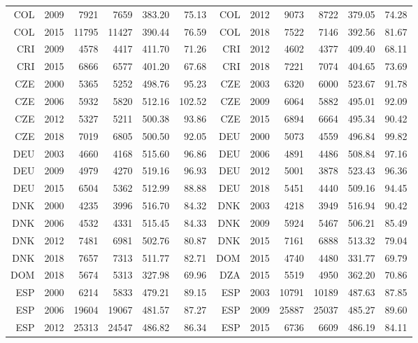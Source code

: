 {\begin{longtable}{r|r|r|r|r|r||r|r|r|r|r|r}
    COL   & 2009  & 7921  & 7659  & 383.20 & 75.13 & COL   & 2012  & 9073  & 8722  & 379.05 & 74.28 \\
    COL   & 2015  & 11795 & 11427 & 390.44 & 76.59 & COL   & 2018  & 7522  & 7146  & 392.56 & 81.67 \\
    CRI   & 2009  & 4578  & 4417  & 411.70 & 71.26 & CRI   & 2012  & 4602  & 4377  & 409.40 & 68.11 \\
    CRI   & 2015  & 6866  & 6577  & 401.20 & 67.68 & CRI   & 2018  & 7221  & 7074  & 404.65 & 73.69 \\
    CZE   & 2000  & 5365  & 5252  & 498.76 & 95.23 & CZE   & 2003  & 6320  & 6000  & 523.67 & 91.78 \\
    CZE   & 2006  & 5932  & 5820  & 512.16 & 102.52 & CZE   & 2009  & 6064  & 5882  & 495.01 & 92.09 \\
    CZE   & 2012  & 5327  & 5211  & 500.38 & 93.86 & CZE   & 2015  & 6894  & 6664  & 495.34 & 90.42 \\
    CZE   & 2018  & 7019  & 6805  & 500.50 & 92.05 & DEU   & 2000  & 5073  & 4559  & 496.84 & 99.82 \\
    DEU   & 2003  & 4660  & 4168  & 515.60 & 96.86 & DEU   & 2006  & 4891  & 4486  & 508.84 & 97.16 \\
    DEU   & 2009  & 4979  & 4270  & 519.16 & 96.93 & DEU   & 2012  & 5001  & 3878  & 523.43 & 96.36 \\
    DEU   & 2015  & 6504  & 5362  & 512.99 & 88.88 & DEU   & 2018  & 5451  & 4440  & 509.16 & 94.45 \\
    DNK   & 2000  & 4235  & 3996  & 516.70 & 84.32 & DNK   & 2003  & 4218  & 3949  & 516.94 & 90.42 \\
    DNK   & 2006  & 4532  & 4331  & 515.45 & 84.33 & DNK   & 2009  & 5924  & 5467  & 506.21 & 85.49 \\
    DNK   & 2012  & 7481  & 6981  & 502.76 & 80.87 & DNK   & 2015  & 7161  & 6888  & 513.32 & 79.04 \\
    DNK   & 2018  & 7657  & 7313  & 511.77 & 82.71 & DOM   & 2015  & 4740  & 4480  & 331.77 & 69.79 \\
    DOM   & 2018  & 5674  & 5313  & 327.98 & 69.96 & DZA   & 2015  & 5519  & 4950  & 362.20 & 70.86 \\
    ESP   & 2000  & 6214  & 5833  & 479.21 & 89.15 & ESP   & 2003  & 10791 & 10189 & 487.63 & 87.85 \\
    ESP   & 2006  & 19604 & 19067 & 481.57 & 87.27 & ESP   & 2009  & 25887 & 25037 & 485.27 & 89.60 \\
    ESP   & 2012  & 25313 & 24547 & 486.82 & 86.34 & ESP   & 2015  & 6736  & 6609  & 486.19 & 84.11 \\

\end{longtable}}
